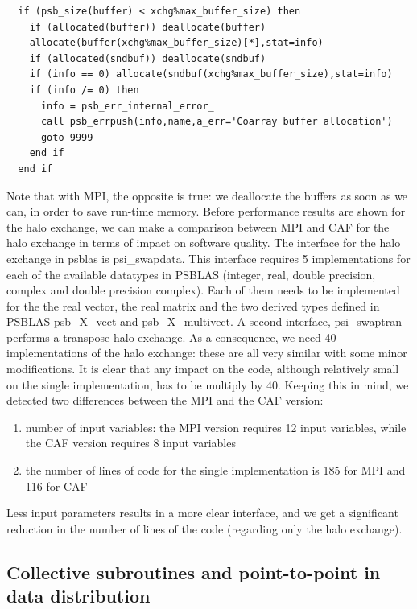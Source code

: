 \documentclass{IOS-Book-Article}
\begin{document}
\lstset{language=Fortran} 
\begin{lstlisting}
  if (psb_size(buffer) < xchg%max_buffer_size) then
    if (allocated(buffer)) deallocate(buffer)
    allocate(buffer(xchg%max_buffer_size)[*],stat=info)
    if (allocated(sndbuf)) deallocate(sndbuf)
    if (info == 0) allocate(sndbuf(xchg%max_buffer_size),stat=info)
    if (info /= 0) then
      info = psb_err_internal_error_
      call psb_errpush(info,name,a_err='Coarray buffer allocation')
      goto 9999
    end if
  end if
\end{lstlisting}

Note that with MPI, the opposite is true: we deallocate the buffers as soon as we can, in order to save run-time memory.
Before performance results are shown for the halo exchange, we can make a comparison between MPI and CAF for the halo exchange in terms of impact on software quality.
The interface for the halo exchange in psblas is psi\_swapdata. This interface requires 5 implementations for each of the available datatypes in PSBLAS (integer, real, double precision, complex and double precision complex). Each of them needs to be implemented for the the real vector, the real matrix and the two derived types defined in PSBLAS psb\_X\_vect and psb\_X\_multivect. A second interface, psi\_swaptran performs a transpose halo exchange. As a consequence, we need 40 implementations of the halo exchange: these are all very similar with some minor modifications. It is clear that any impact on the code, although relatively small on the single implementation, has to be multiply by 40. 
Keeping this in mind, we detected two differences between the MPI and the CAF version:

\begin{enumerate}
\item number of input variables: the MPI version requires 12 input variables, while the CAF version requires 8 input variables
\item the number of lines of code for the single implementation is 185 for MPI and 116 for CAF 
\end{enumerate}

Less input parameters results in a more clear interface, and we get a significant reduction in the number of lines of the code (regarding only the halo exchange).
  
\subsection{Collective subroutines and point-to-point in data distribution}
\end{document}
